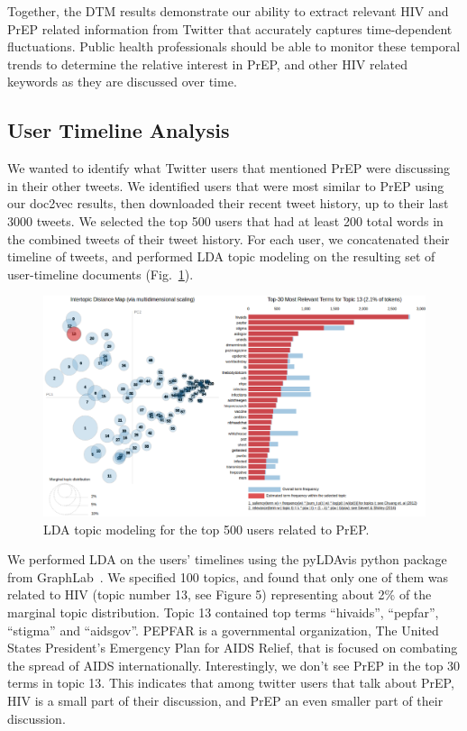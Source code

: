 \documentclass[conference]{IEEEtran}
\begin{document}
Together, the DTM results demonstrate our ability to extract relevant HIV and PrEP related information from Twitter that accurately captures time-dependent fluctuations. Public health professionals should be able to monitor these temporal trends to determine the relative interest in PrEP, and other HIV related keywords as they are discussed over time.

\subsection{User Timeline Analysis}

We wanted to identify what Twitter users that mentioned PrEP were discussing in their other tweets. We identified users that were most similar to PrEP using our doc2vec results, then downloaded their recent tweet history, up to their last 3000 tweets. We selected the top 500 users that had at least 200 total words in the combined tweets of their tweet history. For each user, we concatenated their timeline of tweets, and performed LDA topic modeling on the resulting set of user-timeline documents (Fig.~\ref{fig:lda}).

\begin{figure}
\centering
\includegraphics[scale=0.5]{figs/Fig5}
\caption{LDA topic modeling for the top 500 users related to PrEP.}
\label{fig:lda}
\end{figure}

We performed LDA on the users' timelines using the pyLDAvis python package from GraphLab~\cite{low2014graphlab}. We specified 100 topics, and found that only one of them was related to HIV (topic number 13, see Figure 5) representing about 2\% of the marginal topic distribution. Topic 13 contained top terms ``hivaids'', ``pepfar'', ``stigma'' and ``aidsgov''. PEPFAR is a governmental organization, The United States President's Emergency Plan for AIDS Relief, that is focused on combating the spread of AIDS internationally. Interestingly, we don't see PrEP in the top 30 terms in topic 13. This indicates that among twitter users that talk about PrEP, HIV is a small part of their discussion, and PrEP an even smaller part of their discussion.
\end{document}
